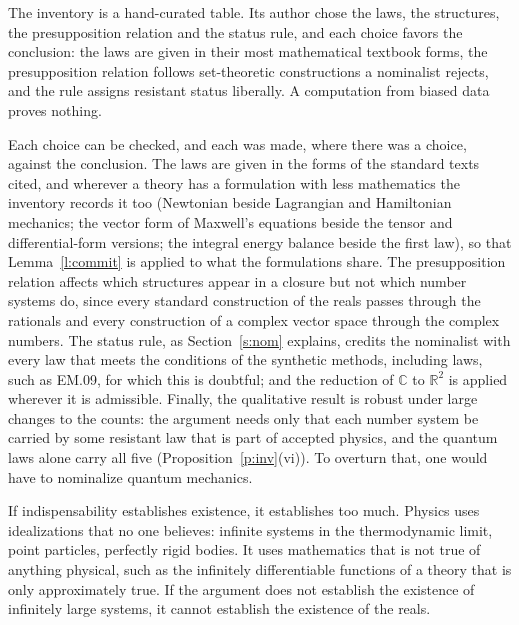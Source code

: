 \documentclass{situationist-preprint}
\begin{document}
\begin{objection}\label{o:bias}
The inventory is a hand-curated table. Its author chose the laws, the structures, the presupposition relation and the status rule, and each choice favors the conclusion: the laws are given in their most mathematical textbook forms, the presupposition relation follows set-theoretic constructions a nominalist rejects, and the rule assigns resistant status liberally. A computation from biased data proves nothing.
\end{objection}

\begin{reply}
Each choice can be checked, and each was made, where there was a choice, against the conclusion. The laws are given in the forms of the standard texts cited, and wherever a theory has a formulation with less mathematics the inventory records it too (Newtonian beside Lagrangian and Hamiltonian mechanics; the vector form of Maxwell's equations beside the tensor and differential-form versions; the integral energy balance beside the first law), so that Lemma~\ref{l:commit} is applied to what the formulations share. The presupposition relation affects which structures appear in a closure but not which number systems do, since every standard construction of the reals passes through the rationals and every construction of a complex vector space through the complex numbers. The status rule, as Section~\ref{s:nom} explains, credits the nominalist with every law that meets the conditions of the synthetic methods, including laws, such as EM.09, for which this is doubtful; and the reduction of $\mathbb C$ to $\mathbb R^2$ is applied wherever it is admissible. Finally, the qualitative result is robust under large changes to the counts: the argument needs only that each number system be carried by some resistant law that is part of accepted physics, and the quantum laws alone carry all five (Proposition~\ref{p:inv}(vi)). To overturn that, one would have to nominalize quantum mechanics.
\end{reply}

\begin{objection}[Overgeneration]\label{o:over}
If indispensability establishes existence, it establishes too much. Physics uses idealizations that no one believes: infinite systems in the thermodynamic limit, point particles, perfectly rigid bodies. It uses mathematics that is not true of anything physical, such as the infinitely differentiable functions of a theory that is only approximately true. If the argument does not establish the existence of infinitely large systems, it cannot establish the existence of the reals.
\end{objection}
\end{document}
